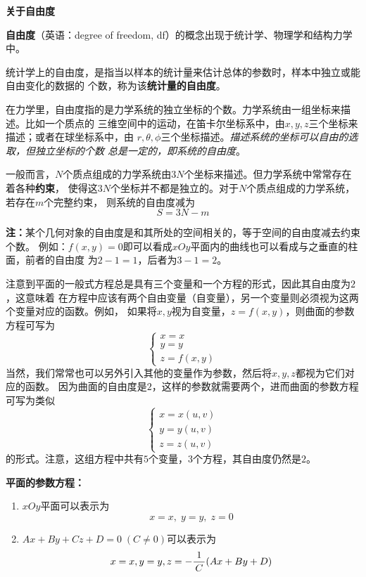 \begin{shaded}
	{\bf 关于自由度}
	
	{\bf 自由度}（英语：degree of freedom, df）的概念出现于统计学、物理学和结构力学中。

	统计学上的自由度，是指当以样本的统计量来估计总体的参数时，样本中独立或能自由变化的数据的
	个数，称为该{\bf 统计量的自由度}。

	在力学里，自由度指的是力学系统的独立坐标的个数。力学系统由一组坐标来描述。比如一个质点的
	三维空间中的运动，在笛卡尔坐标系中，由$x, y, z$三个坐标来描述；或者在球坐标系中，由
	$r,\theta,\phi$三个坐标描述。{\it 描述系统的坐标可以自由的选取，但独立坐标的个数
	总是一定的，即系统的自由度}。

	一般而言，$N$个质点组成的力学系统由$3N$个坐标来描述。但力学系统中常常存在着各种{\bf 约束}，
	使得这$3N$个坐标并不都是独立的。对于$N$个质点组成的力学系统，若存在$m$个完整约束，
	则系统的自由度减为
	$$S=3N-m$$
\end{shaded}

{\bf 注：}某个几何对象的自由度是和其所处的空间相关的，等于空间的自由度减去约束个数。
例如：$f(x,y)=0$即可以看成$xOy$平面内的曲线也可以看成与之垂直的柱面，前者的自由度
为$2-1=1$，后者为$3-1=2$。

注意到平面的一般式方程总是具有三个变量和一个方程的形式，因此其自由度为$2$，这意味着
在方程中应该有两个自由变量（自变量），另一个变量则必须视为这两个变量对应的函数。例如，
如果将$x,y$视为自变量，$z=f(x,y)$，则曲面的参数方程可写为
$$\left\{\begin{array}{l}
	x=x\\ y=y \\ z=f(x,y)
\end{array}\right.$$
当然，我们常常也可以另外引入其他的变量作为参数，然后将$x,y,z$都视为它们对应的函数。
因为曲面的自由度是$2$，这样的参数就需要两个，进而曲面的参数方程可写为类似
$$\left\{\begin{array}{l}
	x=x(u,v)\\ y=y(u,v) \\ z=z(u,v)
\end{array}\right.$$
的形式。注意，这组方程中共有$5$个变量，$3$个方程，其自由度仍然是$2$。

{\bf 平面的参数方程：}
\begin{enumerate}[(1)]
  \setlength{\itemindent}{1cm}
  \item $xOy$平面可以表示为
  $${x=x,\;y=y,\;z=0}$$ 
  \item $Ax+By+Cz+D=0\;(C\ne 0)$可以表示为 
  $${x=x,y=y,z=-\displaystyle\frac{\,{1}\,}{\,{C}\,}(Ax+By+D)}$$
\end{enumerate}

